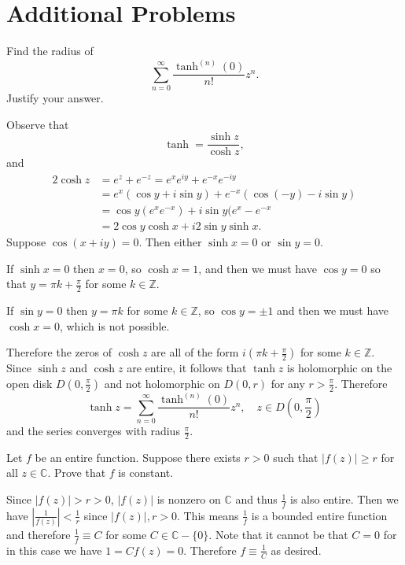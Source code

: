 \documentclass{article}
\newcounter{Problem}
\newenvironment{Problem}{\begin{Exercise}[name={Problem},
                                          counter={Problem}]}
                        {\end{Exercise}}
\begin{document}
\section{Additional Problems}
\begin{Problem}
Find the radius of
$$
\sum_{n=0}^\infty \frac{\tanh^{(n)}(0)}{n!} z^n.
$$
Justify your answer.
\end{Problem}

\begin{Answer}
Observe that
$$
\tanh = \frac{\sinh z}{\cosh z},
$$
and
\begin{align*}
   2\cosh z
&= e^z + e^{-z} = e^x e^{iy} + e^{-x} e^{-iy} \\
&= e^x (\cos y + i \sin y) + e^{-x} (\cos (-y) - i \sin y) \\
&= \cos y (e^x e^{-x}) + i \sin y (e^x - e^{-x} \\
&= 2 \cos y \cosh x + i 2 \sin y \sinh x.
\end{align*}
Suppose $\cos (x + iy) = 0$. Then either
$\sinh x = 0$ or $\sin y = 0$.

If $\sinh x = 0$ then $x = 0$, so $\cosh x = 1$,
and then we must have
$\cos y = 0$ so that
$y = \pi k + \frac{\pi}{2}$ for some $k \in \mathbb{Z}$.

If $\sin y = 0$ then $y = \pi k$ for some $k \in \mathbb{Z}$,
so $\cos y = \pm 1$ and then we must have $\cosh x = 0$, which is
not possible.

Therefore the zeros of $\cosh z$ are all of the form
$i \left( \pi k + \frac{\pi}{2} \right)$ for some $k \in \mathbb{Z}$.
Since $\sinh z$ and $\cosh z$ are entire, it follows that
$\tanh z$ is holomorphic on the open disk $D\left(0, \frac{\pi}{2}\right)$
and not holomorphic on $D(0, r)$ for any $r > \frac{\pi}{2}$.
Therefore
$$
\tanh z = \sum_{n=0}^\infty \frac{\tanh^{(n)}(0)}{n!} z^n, \quad
z \in D\left(0, \frac{\pi}{2}\right)
$$
and the series converges with radius $\frac{\pi}{2}$.
\end{Answer}

\begin{Problem}
Let $f$ be an entire function. Suppose there exists $r > 0$ such that
$|f(z)| \geq r$ for all $z \in \mathbb{C}$. Prove that $f$ is constant.
\end{Problem}

\begin{Answer}
Since $|f(z)| > r > 0$, $|f(z)|$ is nonzero on $\mathbb{C}$ and thus
$\frac{1}{f}$ is also entire. Then we have
$\left|\frac{1}{f(z)}\right| < \frac{1}{r}$ since $|f(z)|, r > 0$.
This means $\frac{1}{f}$ is a bounded entire function and therefore
$\frac{1}{f} \equiv C$ for some $C \in \mathbb{C} - \{ 0 \}$.
Note that it cannot be that $C = 0$ for in this case we have
$1 = C f(z) = 0$. Therefore $f \equiv \frac{1}{C}$ as desired.
\end{Answer}
\end{document}
